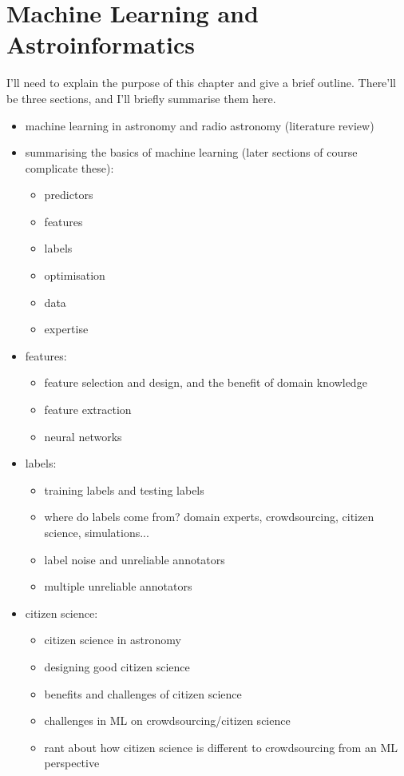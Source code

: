 \chapter{Machine Learning and Astroinformatics}
\label{cha:background-ml}

    I'll need to explain the purpose of this chapter and give a brief outline. There'll be three sections, and I'll briefly summarise them here.

    \begin{itemize}
        \item machine learning in astronomy and radio astronomy (literature review)
        \item summarising the basics of machine learning (later sections of course complicate these): \begin{itemize}
            \item predictors
            \item features
            \item labels
            \item optimisation
            \item data
            \item expertise
        \end{itemize}
        \item features: \begin{itemize}
            \item feature selection and design, and the benefit of domain knowledge
            \item feature extraction
            \item neural networks
        \end{itemize}
        \item labels: \begin{itemize}
            \item training labels and testing labels
            \item where do labels come from? domain experts, crowdsourcing, citizen science, simulations...
            \item label noise and unreliable annotators
            \item multiple unreliable annotators
        \end{itemize}
        \item citizen science: \begin{itemize}
            \item citizen science in astronomy
            \item designing good citizen science
            \item benefits and challenges of citizen science
            \item challenges in ML on crowdsourcing/citizen science
            \item rant about how citizen science is different to crowdsourcing from an ML perspective
        \end{itemize}
    \end{itemize}

